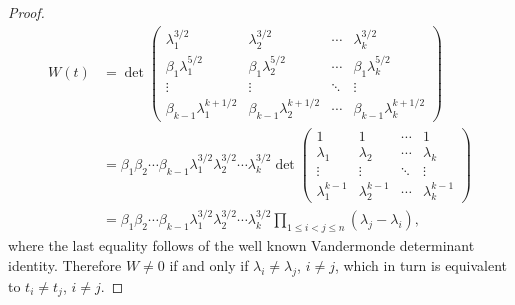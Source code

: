 \documentclass[twoside]{article}
\theoremstyle{remark}
\begin{document}
\begin{proof}
\[
\begin{split}
  W(t)&=\det
    \begin{pmatrix}
      \lambda_1^{3/2} & \lambda_2^{3/2} &\cdots & \lambda_k^{3/2} \\
      \beta_1\lambda_1^{5/2} &\beta_1 \lambda_2^{5/2} &\cdots &\beta_1 \lambda_k^{5/2}\\
      \vdots & \vdots &\ddots & \vdots\\
      \beta_{k-1}\lambda_1^{k+1/2} & \beta_{k-1}\lambda_2^{k+1/2} &\cdots & \beta_{k-1}\lambda_k^{k+1/2}
    \end{pmatrix}
  \\
  &= \beta_1\beta_2\cdots\beta_{k-1} \lambda_1^{3/2}\lambda_2^{3/2}\cdots \lambda_k^{3/2}
     \det \begin{pmatrix}
      1& 1 &\cdots & 1 \\
      \lambda_1 & \lambda_2 &\cdots & \lambda_k\\
      \vdots & \vdots &\ddots & \vdots\\
      \lambda_1^{k-1} & \lambda_2^{k-1} &\cdots & \lambda_k^{k-1}
    \end{pmatrix}
  \\
  &= \beta_1\beta_2\cdots\beta_{k-1} \lambda_1^{3/2}\lambda_2^{3/2}\cdots \lambda_k^{3/2}
  \prod_{1\leq i<j\leq n}(\lambda_j-\lambda_i)
,
\end{split}
\]
where the last equality follows of the well known Vandermonde determinant identity. Therefore $W\neq 0$ if and only if $\lambda_i\neq\lambda_j$, $i\neq j$,
which in turn is equivalent to $t_i\neq t_j$, $i\neq j$.
\end{proof}
\end{document}
